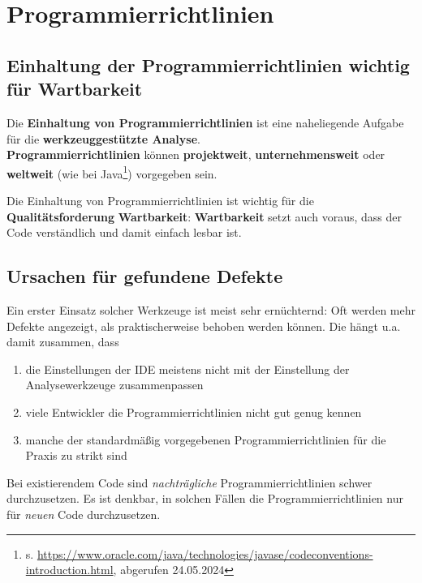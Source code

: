 \section{Programmierrichtlinien}\label{sec:programmierrichtlinien}

\subsection*{Einhaltung der Programmierrichtlinien wichtig für Wartbarkeit}

Die \textbf{Einhaltung von Programmierrichtlinien} ist eine naheliegende Aufgabe für die \textbf{werkzeuggestützte Analyse}.\\
\textbf{Programmierrichtlinien} können \textbf{projektweit}, \textbf{unternehmensweit} oder \textbf{weltweit} (wie bei Java\footnote{
s. \url{https://www.oracle.com/java/technologies/javase/codeconventions-introduction.html}, abgerufen 24.05.2024
}) vorgegeben sein.\\

\begin{tcolorbox}[colback=white]
Die Einhaltung von Programmierrichtlinien ist wichtig für die \textbf{Qualitätsforderung} \textbf{Wartbarkeit}: \textbf{Wartbarkeit} setzt auch voraus, dass der Code verständlich und damit einfach lesbar ist.
\end{tcolorbox}
\vspace{2mm}

\subsection*{Ursachen für gefundene Defekte}
Ein erster Einsatz solcher Werkzeuge ist meist sehr ernüchternd: Oft werden mehr Defekte angezeigt, als praktischerweise behoben werden können.
Die hängt u.a. damit zusammen, dass

\begin{enumerate}
    \item die Einstellungen der IDE meistens nicht mit der Einstellung der Analysewerkzeuge zusammenpassen
    \item viele Entwickler die Programmierrichtlinien nicht gut genug kennen
    \item manche der standardmäßig vorgegebenen Programmierrichtlinien für die Praxis zu strikt sind
\end{enumerate}

\noindent
Bei existierendem Code sind \textit{nachträgliche} Programmierrichtlinien schwer durchzusetzen.
Es ist denkbar, in solchen Fällen die Programmierrichtlinien nur für \textit{neuen} Code durchzusetzen.

